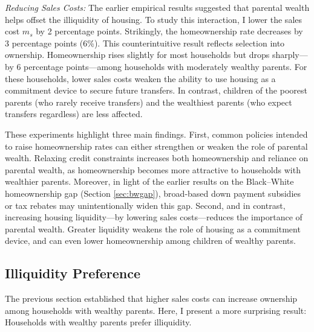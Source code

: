 \documentclass[12pt]{article}
\begin{document}
\textit{Reducing Sales Costs:} 
The earlier empirical results suggested that parental wealth helps offset the illiquidity of housing. To study this interaction, I lower the sales cost $m_s$ by 2 percentage points. Strikingly, the homeownership rate decreases by 3 percentage points (6\%). This counterintuitive result reflects selection into ownership. Homeownership rises slightly for most households but drops sharply---by 6 percentage points---among households with moderately wealthy parents. For these households, lower sales costs weaken the ability to use housing as a commitment device to secure future transfers. In contrast, children of the poorest parents (who rarely receive transfers) and the wealthiest parents (who expect transfers regardless) are less affected.



\begin{table}[tb]
	\centering
\end{table}

These experiments highlight three main findings. First, common policies intended to raise homeownership rates can either strengthen or weaken the role of parental wealth. Relaxing credit constraints increases both homeownership and reliance on parental wealth, as homeownership becomes more attractive to households with wealthier parents. Moreover, in light of the earlier results on the Black–White homeownership gap (Section \ref{sec:bwgap}), broad-based down payment subsidies or tax rebates may unintentionally widen this gap. Second, and in contrast, increasing housing liquidity---by lowering sales costs---reduces the importance of parental wealth. Greater liquidity weakens the role of housing as a commitment device, and can even lower homeownership among children of wealthy parents. 

\subsection{Illiquidity Preference}\label{sec:adjcost}
The previous section established that higher sales costs can increase ownership among households with wealthy parents. Here, I present a more surprising result: Households with wealthy parents prefer illiquidity.
\end{document}
